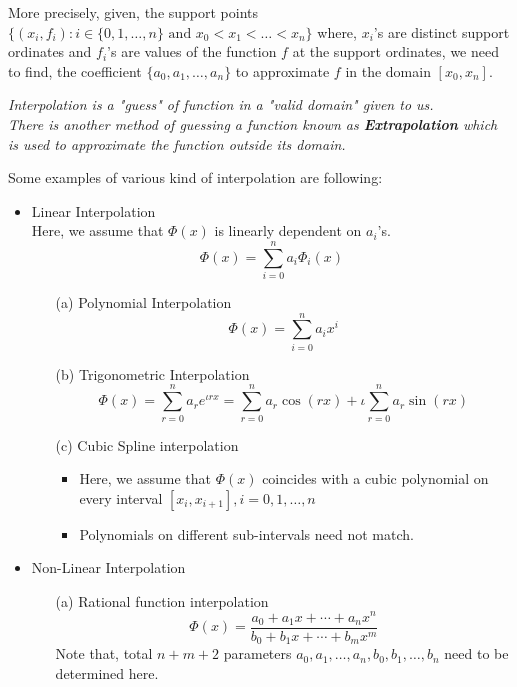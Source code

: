 More precisely, given, the support points $\{(x_i,f_i): i \in \{0,1,\ldots,n\} \text{ and } x_0 < x_1 < \ldots < x_n \}$ where, $x_i$'s are distinct support ordinates and $f_i$'s are values of the function $f$ at the support ordinates, we need to find, the coefficient $\{a_0,a_1,\ldots,a_n\}$ to approximate $f$ in the domain $[x_0,x_n]$.

\begin{rmk}
	\textit{Interpolation is a "guess" of function in a "valid domain" given to us. \\
		There is another method of guessing a function known as \textbf{Extrapolation} which is used to approximate the function outside its domain.}
\end{rmk}
\begin{example}
	Some examples of various kind of interpolation are following:
	\begin{itemize}
		\item Linear Interpolation
		      \\ Here, we assume that $ \Phi(x) $ is linearly dependent on $a_i$'s.
		      \[
			      \Phi(x) = \sum_{i=0}^{n}a_i\Phi_i(x)
		      \]
		      \begin{itemize}
			      \item[(a)] Polynomial Interpolation
				      \[\Phi(x) = \sum_{i=0}^{n}a_ix^i\]
			      \item[(b)] Trigonometric Interpolation
					  \[\Phi(x) = \sum_{r=0}^{n}a_re^{\iota rx} = \sum_{r=0}^{n}a_r\cos(rx) + \iota\sum_{r=0}^{n}a_r\sin(rx) \]
			      \item[(c)] Cubic Spline interpolation
				      \begin{itemize}
					      \item Here, we assume that $ \Phi(x) $ coincides with a cubic polynomial on every interval $ [x_i,x_{i+1}], i = 0,1,\ldots,n $
					      \item Polynomials on different sub-intervals need not match.
				      \end{itemize}
		      \end{itemize}
		\item Non-Linear Interpolation
		      \begin{itemize}
				  \item[(a)] Rational function interpolation
			            \[
				            \Phi(x) = \frac{a_0+a_1x+\cdots+a_nx^n}{b_0+b_1x+\cdots+b_mx^m}
			            \]
			            Note that, total $ n+m+2 $ parameters $ a_0,a_1,\ldots,a_n,b_0,b_1,\ldots,b_n $ need to be determined here.
		      \end{itemize}
	\end{itemize}

\end{example}






